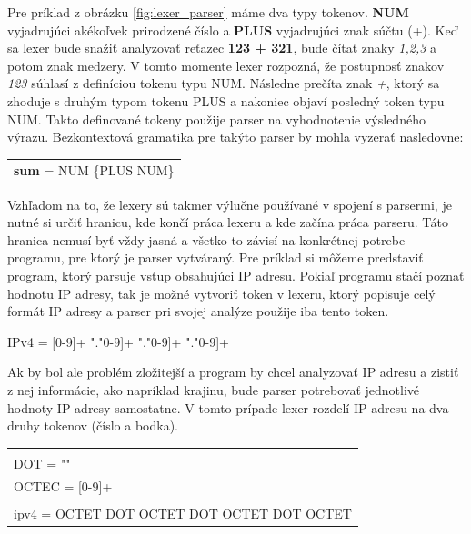 Pre príklad z obrázku \ref{fig:lexer_parser}  máme dva typy tokenov. \textbf{NUM} vyjadrujúci akékoľvek prirodzené číslo a \textbf{PLUS} vyjadrujúci znak súčtu (+). Keď sa lexer bude snažiť analyzovať reťazec \textbf{123 + 321}, bude čítať znaky \textit{1,2,3} a potom znak medzery. V tomto momente lexer rozpozná, že postupnosť znakov \textit{123} súhlasí z definíciou tokenu typu NUM. Následne prečíta znak \textit{+}, ktorý sa zhoduje s druhým typom tokenu PLUS a nakoniec objaví posledný token typu NUM. Takto definované tokeny použije parser na vyhodnotenie výsledného výrazu. Bezkontextová gramatika pre takýto parser by mohla vyzerať nasledovne:

\begin{center}
\begin{tabular}{p{}}
\textbf{sum} = NUM \{PLUS NUM\}
\end{tabular}
\end{center}

Vzhľadom na to, že lexery sú takmer výlučne používané v spojení s parsermi, je nutné si určiť hranicu, kde končí práca lexeru a kde začína práca parseru. Táto hranica nemusí byť vždy jasná a všetko to závisí na konkrétnej potrebe programu, pre ktorý je parser vytváraný. Pre príklad si môžeme predstaviť program, ktorý parsuje vstup obsahujúci IP adresu. Pokiaľ programu stačí poznať hodnotu IP adresy, tak je možné vytvoriť token v lexeru, ktorý popisuje celý formát IP adresy a parser pri svojej analýze použije iba tento token. 
\begin{center}
IPv4 = [0-9]+ "."\text{ [}0-9]+ "."\text{ [}0-9]+ "."\text{ [}0-9]+
\end{center}

Ak by bol ale problém zložitejší a program by chcel analyzovať IP adresu a zistiť z nej informácie, ako napríklad krajinu, bude parser potrebovať jednotlivé hodnoty IP adresy samostatne. V tomto prípade lexer rozdelí IP adresu na dva druhy tokenov (číslo a bodka).

\begin{center}
\begin{tabular}{p{}}
\color{editorGray}{/* Lexer */}\\
DOT   = "\text{.}"\\
OCTEC = [0-9]+\\
\color{editorGray}{/* Parser */}\\
ipv4  = OCTET DOT OCTET DOT OCTET DOT OCTET
\end{tabular}
\end{center}

